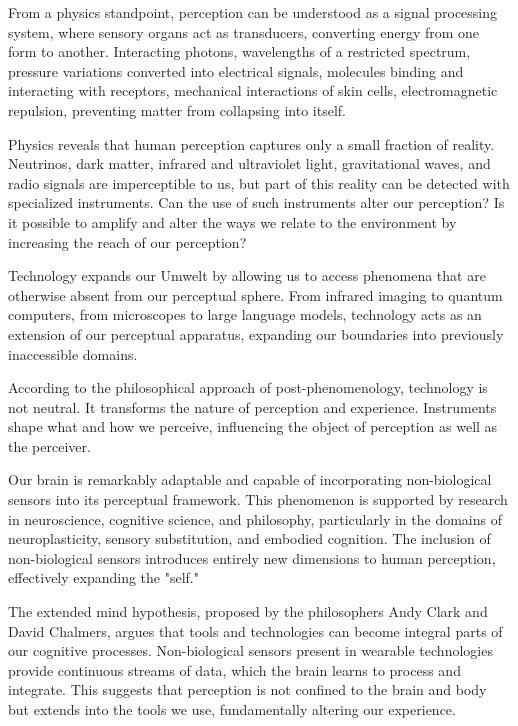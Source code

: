 From a physics standpoint, perception can be understood as a signal processing system, where sensory organs act as transducers, converting energy from one form to another. Interacting photons, wavelengths of a restricted spectrum, pressure variations converted into electrical signals, molecules binding and interacting with receptors, mechanical interactions of skin cells, electromagnetic repulsion, preventing matter from collapsing into itself.

Physics reveals that human perception captures only a small fraction of reality. Neutrinos, dark matter, infrared and ultraviolet light, gravitational waves, and radio signals are imperceptible to us, but part of this reality can be detected with specialized instruments. Can the use of such instruments alter our perception? Is it possible to amplify and alter the ways we relate to the environment by increasing the reach of our perception?

Technology expands our Umwelt by allowing us to access phenomena that are otherwise absent from our perceptual sphere. From infrared imaging to quantum computers, from microscopes to large language models, technology acts as an extension of our perceptual apparatus, expanding our boundaries into previously inaccessible domains.

According to the philosophical approach of post-phenomenology, technology is not neutral. It transforms the nature of perception and experience. Instruments shape what and how we perceive, influencing the object of perception as well as the perceiver.

Our brain is remarkably adaptable and capable of incorporating non-biological sensors into its perceptual framework. This phenomenon is supported by research in neuroscience, cognitive science, and philosophy, particularly in the domains of neuroplasticity, sensory substitution, and embodied cognition. The inclusion of non-biological sensors introduces entirely new dimensions to human perception, effectively expanding the "self."

The extended mind hypothesis, proposed by the philosophers Andy Clark and David Chalmers, argues that tools and technologies can become integral parts of our cognitive processes. Non-biological sensors present in wearable technologies provide continuous streams of data, which the brain learns to process and integrate. This suggests that perception is not confined to the brain and body but extends into the tools we use, fundamentally altering our experience.

